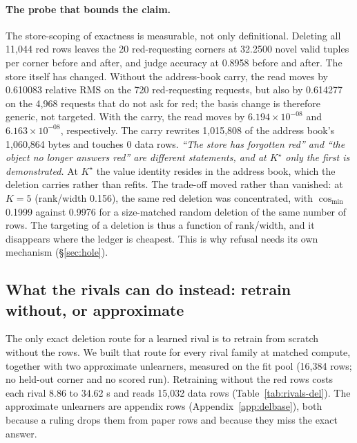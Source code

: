 \documentclass{article} %
\newcommand{\sci}[2]{\ensuremath{#1\times10^{#2}}}
\newcommand{\Kstar}{\ensuremath{K^{\star}}}
\begin{document}
\paragraph{The probe that bounds the claim.} The store-scoping of exactness is measurable, not
only definitional. Deleting all 11,044 red rows leaves the 20 red-requesting corners at 32.2500
novel valid tuples per corner before and after, and judge accuracy at 0.8958 before and after.
The store itself has changed. Without the address-book carry, the read moves by 0.610083
relative RMS on the 720 red-requesting requests, but also by 0.614277 on the 4,968 requests
that do not ask for red; the basis change is therefore generic, not targeted. With the carry,
the read moves by \sci{6.194}{-08} and \sci{6.163}{-08}, respectively. The carry rewrites
1,015,808 of the address book's 1,060,864 bytes and touches 0 data rows. %
\emph{``The store has forgotten red'' and ``the object no longer answers red'' are different
statements, and at $\Kstar$ only the first is demonstrated.} At $\Kstar$ the value identity
resides in the address book, which the deletion carries rather than refits. The trade-off moved
rather than vanished: at $K=5$ (rank/width 0.156), the same red deletion was concentrated, with
$\cos_{\min}$ 0.1999 against 0.9976 for a size-matched random deletion of the same number of
rows. %
The targeting of a deletion is thus a function of rank/width, and it disappears where the ledger
is cheapest. This is why refusal needs its own mechanism (\S\ref{sec:hole}).

\subsection{What the rivals can do instead: retrain without, or approximate}
\label{sec:del-comparators}

The only exact deletion route for a learned rival is to retrain from scratch without the rows.
We built that route for every rival family at matched compute, together with two approximate
unlearners, measured on the fit pool (16,384 rows; no held-out corner and no scored run).
Retraining without the red rows costs each rival 8.86 to 34.62 s and reads 15,032 data rows
(Table~\ref{tab:rivals-del}). The approximate unlearners are appendix rows
(Appendix~\ref{app:delbase}), both because a ruling drops them from paper rows and because
they miss the exact answer. %
\end{document}
